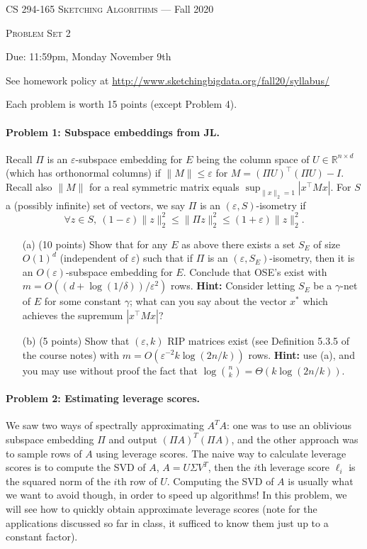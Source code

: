 \documentclass[12pt]{article}
\newcommand{\eps}{\varepsilon}
\newcommand{\R}{\mathbb{R}}
\begin{document}
\thispagestyle{empty}

\begin{center}
{\Large \textsc{CS 294-165 Sketching Algorithms} --- Fall 2020}

\bigskip

{\Large \textsc{Problem Set 2}}

\smallskip

Due: 11:59pm, Monday November 9th

\bigskip

{\footnotesize See homework policy at \url{http://www.sketchingbigdata.org/fall20/syllabus/}}

{\footnotesize Each problem is worth 15 points (except Problem 4).}
\end{center}

\paragraph{Problem 1: Subspace embeddings from JL.}
Recall $\Pi$ is an $\eps$-subspace embedding for $E$ being the column space of $U\in\R^{n\times d}$ (which has orthonormal columns) if $\|M\|\le \eps$ for $M = (\Pi U)^\top (\Pi U) - I$. Recall also $\|M\|$ for a real symmetric matrix equals $\sup_{\|x\|_2 = 1} |x^\top M x|$. For $S$ a (possibly infinite) set of vectors, we say $\Pi$ is an $(\eps, S)$-isometry if
$$
\forall z\in S,\ (1-\eps)\|z\|_2^2 \le \|\Pi z\|_2^2 \le (1+\eps)\|z\|_2^2 .
$$
\begin{itemize}
\item[(a)] (10 points) Show that for any $E$ as above there exists a set $S_E$ of size $O(1)^d$ (independent of $\eps$) such that if $\Pi$ is an $(\eps,S_E)$-isometry, then it is an $O(\eps)$-subspace embedding for $E$. Conclude that OSE's exist with $m = O((d+\log(1/\delta))/\eps^2)$ rows. \textbf{Hint:} Consider letting $S_E$ be a $\gamma$-net of $E$ for some constant $\gamma$; what can you say about the vector $x^*$ which achieves the supremum $|x^\top M x|$?
  \item[(b)] (5 points) Show that $(\eps, k)$ RIP matrices exist (see Definition 5.3.5 of the course notes) with $m = O(\eps^{-2}k\log(2n/k))$ rows. \textbf{Hint:} use (a), and you may use without proof the fact that $\log\binom nk = \Theta(k\log(2n/k))$.
  \end{itemize}

\paragraph{Problem 2: Estimating leverage scores.} We saw two ways of spectrally approximating $A^T A$: one was to use an oblivious subspace embedding $\Pi$ and output $(\Pi A)^T (\Pi A)$, and the other approach was to sample rows of $A$ using leverage scores. The naive way to calculate leverage scores is to compute the SVD of $A$, $A = U \Sigma V^T$, then the $i$th leverage score $\ell_i$ is the squared norm of the $i$th row of $U$. Computing the SVD of $A$ is usually what we want to avoid though, in order to speed up algorithms! In this problem, we will see how to quickly obtain approximate leverage scores (note for the applications discussed so far in class, it sufficed to know them just up to a constant factor).
\end{document}
